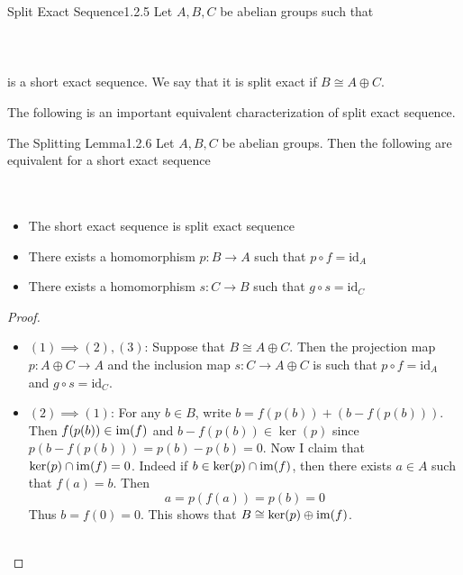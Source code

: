 \documentclass[a4paper]{article}
\begin{document}
\begin{defn}{Split Exact Sequence}{1.2.5} Let $A,B,C$ be abelian groups such that \\~\\
\\~\\
is a short exact sequence. We say that it is split exact if $B\cong A\oplus C$. 
\end{defn}

The following is an important equivalent characterization of split exact sequence. 

\begin{thm}{The Splitting Lemma}{1.2.6} Let $A,B,C$ be abelian groups. Then the following are equivalent for a short exact sequence \\~\\
\\
\begin{itemize}
\item The short exact sequence is split exact sequence
\item There exists a homomorphism $p:B\to A$ such that $p\circ f=\text{id}_A$
\item There exists a homomorphism $s:C\to B$ such that $g\circ s=\text{id}_C$
\end{itemize} \tcbline
\begin{proof}~\\
\begin{itemize}
\item $(1)\implies(2),(3)$: Suppose that $B\cong A\oplus C$. Then the projection map $p:A\oplus C\to A$ and the inclusion map $s:C\to A\oplus C$ is such that $p\circ f=\text{id}_A$ and $g\circ s=\text{id}_C$. 

\item $(2)\implies(1)$: For any $b\in B$, write $b=f(p(b))+(b-f(p(b)))$. Then $f(p(b))\in\operatorname{im}(f)$ and $b-f(p(b))\in\ker(p)$ since $p(b-f(p(b)))=p(b)-p(b)=0$. Now I claim that $\ker(p)\cap\operatorname{im}(f)=0$. Indeed if $b\in\ker(p)\cap\operatorname{im}(f)$, then there exists $a\in A$ such that $f(a)=b$. Then $$a=p(f(a))=p(b)=0$$ Thus $b=f(0)=0$. This shows that $B\cong\ker(p)\oplus\operatorname{im}(f)$. \\~\\


\end{itemize}
\end{proof}
\end{thm}
\end{document}
